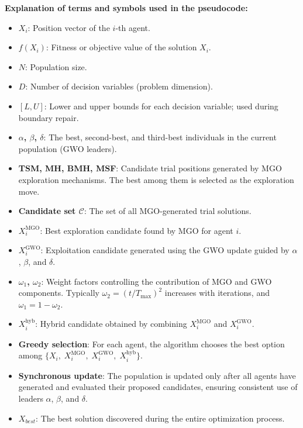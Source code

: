 \documentclass[12pt,a4paper]{article}
\begin{document}
\vspace{2mm}
\noindent \textbf{Explanation of terms and symbols used in the pseudocode:}
\begin{itemize}
    \item \textbf{$X_i$}: Position vector of the $i$-th agent.
    \item \textbf{$f(X_i)$}: Fitness or objective value of the solution $X_i$.
    \item \textbf{$N$}: Population size.
    \item \textbf{$D$}: Number of decision variables (problem dimension).
    \item \textbf{$[L,U]$}: Lower and upper bounds for each decision variable; used during boundary repair.
    \item \textbf{$\alpha$, $\beta$, $\delta$}: The best, second-best, and third-best individuals in the current population (GWO leaders).
    \item \textbf{TSM, MH, BMH, MSF}: Candidate trial positions generated by MGO exploration mechanisms. The best among them is selected as the exploration move.
    \item \textbf{Candidate set $\mathcal{C}$}: The set of all MGO-generated trial solutions.
    \item \textbf{$X_i^{\text{MGO}}$}: Best exploration candidate found by MGO for agent $i$.
    \item \textbf{$X_i^{\text{GWO}}$}: Exploitation candidate generated using the GWO update guided by $\alpha$, $\beta$, and $\delta$.
    \item \textbf{$\omega_1$, $\omega_2$}: Weight factors controlling the contribution of MGO and GWO components. 
          Typically $\omega_2 = (t/T_{\max})^2$ increases with iterations, and $\omega_1 = 1 - \omega_2$.
    \item \textbf{$X_i^{\text{hyb}}$}: Hybrid candidate obtained by combining $X_i^{\text{MGO}}$ and $X_i^{\text{GWO}}$.
    \item \textbf{Greedy selection}: For each agent, the algorithm chooses the best option among 
          $\{X_i,\; X_i^{\text{MGO}},\; X_i^{\text{GWO}},\; X_i^{\text{hyb}}\}$.
    \item \textbf{Synchronous update}: The population is updated only after all agents have generated and evaluated 
          their proposed candidates, ensuring consistent use of leaders $\alpha$, $\beta$, and $\delta$.
    \item \textbf{$X_{best}$}: The best solution discovered during the entire optimization process.
\end{itemize}
\end{document}
